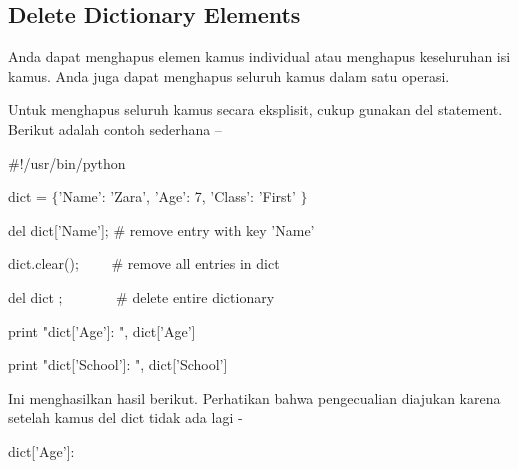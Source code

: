 \subsection*{Delete Dictionary Elements}
 \par
\begin{adjustwidth}{0.03in}{0.03in}
Anda dapat menghapus elemen kamus individual atau menghapus keseluruhan isi kamus. Anda juga dapat menghapus seluruh kamus dalam satu operasi.\end{adjustwidth}
 \par
\begin{adjustwidth}{0.03in}{0.03in}
Untuk menghapus seluruh kamus secara eksplisit, cukup gunakan del statement. Berikut adalah contoh sederhana –\end{adjustwidth}
 \par
\vspace{12pt}
\noindent 
 \hspace*{0.5in}  $  \#  $!/usr/bin/python \par
\vspace{12pt}
\noindent 
 \hspace*{0.5in} dict =  $  \{  $'Name': 'Zara', 'Age': 7, 'Class': 'First' $  \}  $ \par
\vspace{12pt}
\noindent 
 \hspace*{0.5in} del dict['Name'];  $  \#  $ remove entry with key 'Name' \par
\noindent 
 \hspace*{0.5in} dict.clear();~~~~  $  \#  $ remove all entries in dict \par
\noindent 
 \hspace*{0.5in} del dict ;~~~~~~~  $  \#  $ delete entire dictionary \par
\vspace{12pt}
\noindent 
 \hspace*{0.5in} print "dict['Age']: ", dict['Age'] \par
\noindent 
 \hspace*{0.5in} print "dict['School']: ", dict['School'] \par
\begin{adjustwidth}{0.03in}{0.03in}
Ini menghasilkan hasil berikut. Perhatikan bahwa pengecualian diajukan karena setelah kamus del dict tidak ada lagi -\end{adjustwidth}
 \par
\noindent 
{\fontsize{9pt}{9pt}\selectfont  \hspace*{0.5in} dict['Age']:} \par
